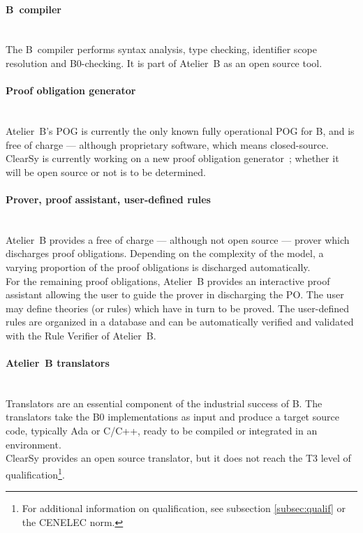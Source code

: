 \paragraph{B~compiler}~\\
The B~compiler performs syntax analysis, type checking, identifier scope resolution and B0-checking. It is part of Atelier~B as an open source tool.

\paragraph{Proof obligation generator}~\\
Atelier~B's POG is currently the only known fully operational POG for B, and is free of charge --- although proprietary software, which means closed-source. ClearSy is currently working on a new proof obligation generator~; whether it will be open source or not is to be determined.

\paragraph{Prover, proof assistant, user-defined rules}~\\
Atelier~B provides a free of charge --- although not open source --- prover which discharges proof obligations. Depending on the complexity of the model, a varying proportion of the proof obligations is discharged automatically.\\
For the remaining proof obligations, Atelier~B provides an interactive proof assistant allowing the user to guide the prover in discharging the PO. The user may define theories (or rules) which have in turn to be proved. The user-defined rules are organized in a database and can be automatically verified and validated with the Rule Verifier of Atelier~B.

\paragraph{Atelier~B translators}~\\
Translators are an essential component of the industrial success of B. The translators take the B0 implementations as input and produce a target source code, typically Ada or C/C++, ready to be compiled or integrated in an environment.\\
ClearSy provides an open source translator, but it does not reach the T3 level of qualification\footnote{For additional information on qualification, see subsection \ref{subsec:qualif} or the CENELEC norm.}.

